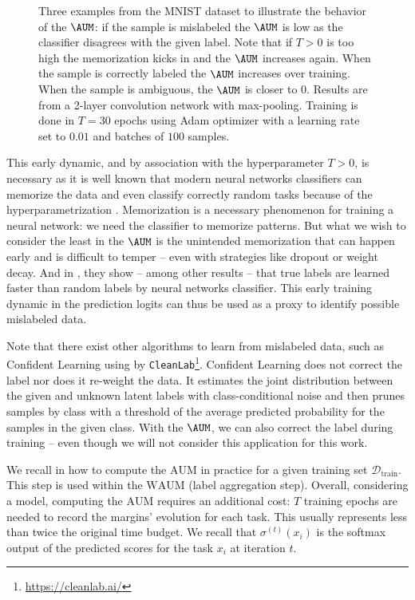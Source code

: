 \begin{figure}[thb]
\begin{center}
\end{center}
\caption{Three examples from the MNIST dataset to illustrate the behavior of the $\AUM$: if the sample is mislabeled the $\AUM$ is low as the classifier disagrees with the given label. Note that if $T>0$ is too high the memorization kicks in and the $\AUM$ increases again. When the sample is correctly labeled the $\AUM$ increases over training. When the sample is ambiguous, the $\AUM$ is closer to $0$. Results are from a 2-layer convolution network with max-pooling. Training is done in $T=30$ epochs using Adam optimizer with a learning rate set to $0.01$ and batches of $100$ samples.}
\label{fig:mnist_aum}
\end{figure}

This early dynamic, and by association with the hyperparameter $T>0$, is necessary as it is well known that modern neural networks classifiers can memorize the data and even classify correctly random tasks because of the hyperparametrization \citep{maennel2020neural}.
Memorization is a necessary phenomenon for training a neural network: we need the classifier to memorize patterns.
But what we wish to consider the least in the $\AUM$ is the unintended memorization \citep{maennel2020neural} that can happen early and is difficult to temper -- even with strategies like dropout or weight decay.
And in \citet{zhang2021understanding}, they show -- among other results -- that true labels are learned faster than random labels by neural networks classifier.
This early training dynamic in the prediction logits can thus be used as a proxy to identify possible mislabeled data.

Note that there exist other algorithms to learn from mislabeled data, such as Confident Learning \citep{northcutt_confident_2021} using by \texttt{CleanLab}\footnote{\url{https://cleanlab.ai/}}.
Confident Learning does not correct the label nor does it re-weight the data.
It estimates the joint distribution between the given and unknown latent labels with class-conditional noise and then prunes samples by class with a threshold of the average predicted probability for the samples in the given class.
With the $\AUM$, we can also correct the label during training -- even though we will not consider this application for this work.

We recall in  how to compute the $\mathrm{AUM}$ in practice for a given training set $\mathcal{D}_{\text{train}}$.
This step is used within the $\mathrm{WAUM}$ (label aggregation step).
Overall, considering a model, computing the $\mathrm{AUM}$ requires an additional cost: $T$ training epochs are needed to record the margins' evolution for each task.
This usually represents less than twice the original time budget.
We recall that $\sigma^{(t)}(x_i)$ is the softmax output of the predicted scores for the task $x_i$ at iteration $t$.


